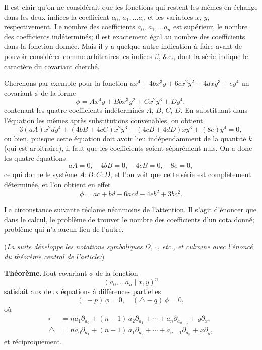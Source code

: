 \documentclass[11pt,a4paper]{article}
\begin{document}
\medskip

Il est clair qu'on ne consid\'erait que les fonctions qui restent les m\^emes en \'echange dans les deux indices la coefficient $a_0$, $a_1, \ldots a_n$ et les variables $x$, $y$, respectivement. Le nombre des coefficients $a_0$, $a_1, \ldots a_n$ est sup\'erieur, le nombre des coefficients ind\'etermin\'es; il est exactement \'egal au nombre des coefficients dans la fonction donn\'ee. Mais il y a quelque autre indication \`a faire avant de pouvoir consid\'erer comme arbitraires les indices $\beta$, $\&$c., dont la s\'erie indique le caract\`ere du covariant cherch\'e.

\medskip

Cherchons par exemple pour la fonction $ax^4 + 4 b x^3 y + 6 c x^2 y^2 + 4 d x y^3 + e y^4$ un covariant $\phi$ de la forme
\[
\phi = A x^4 y + B b x^3 y^2 + C x^2 y^3 + D y^4,
\]
contenant les quatre coefficients ind\'etermin\'es $A$, $B$, $C$, $D$. En substituant dans l'\'equation les m\^emes apr\`es substitutions convenables, on obtient
\[
3 (a A) x^2 d y^4 + (4 b B + 4 c C) x^2 y^3 + (4 c B + 4 d D) x y^3 + (8 e) y^4 = 0,
\]
ou bien, puisque cette \'equation doit avoir lieu ind\'ependamment de la quantit\'e $k$ (qui est arbitraire), il faut que les coefficients soient s\'epar\'ement nuls. On a donc les quatre \'equations
\[
a A = 0,\quad 4 b B = 0,\quad 4 c B = 0,\quad 8 e = 0,
\]
ce qui donne le syst\`eme $A : B : C : D$, et l'on voit que cette s\'erie est compl\`etement d\'etermin\'ee, et l'on obtient en effet
\[
\phi = a c + b d - 6 a c d - 4 e b^2 + 3 b c^2.
\]

\medskip

La circonstance suivante r\'eclame n\'eanmoins de l'attention. Il s'agit d'\'enoncer que dans le calcul, le probl\`eme de trouver le nombre des coefficients d'un cota donn\'e; probl\`eme qui n'a aucun lieu de l'autre.

\medskip

\noindent (\emph{La suite d\'eveloppe les notations symboliques $\Omega$, $\square$, etc., et culmine avec l'\'enonc\'e du th\'eor\`eme central de l'article:})

\medskip

\noindent\textbf{Th\'eor\`eme.}\quad Tout covariant $\phi$ de la fonction
\[ (a_0, \ldots a_n \mid x, y)^n \]
satisfait aux deux \'equations \`a diff\'erences partielles
\[
(\square - p)\,\phi = 0,\quad (\bigtriangleup - q)\,\phi = 0,
\]
o\`u
\begin{align*}
\square &= n a_1 \partial_{a_0} + (n-1)\,a_2 \partial_{a_1} + \cdots + a_n \partial_{a_{n-1}} + y \partial_x,\\
\bigtriangleup &= n a_0 \partial_{a_1} + (n-1)\,a_1 \partial_{a_2} + \cdots + a_{n-1}\partial_{a_n} + x \partial_y,
\end{align*}
et r\'eciproquement.
\end{document}

